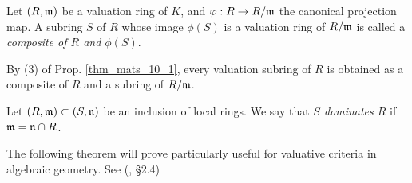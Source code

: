 \begin{defn}
Let $(R, \mathfrak{m})$ be a valuation ring of $K$, and $\varphi: R \to 
R/\mathfrak{m}$ the canonical projection map. A subring $S$ of $R$ whose
image $\phi(S)$ is a valuation ring of $R/\mathfrak{m}$ is called a
\emph{composite of $R$ and $\phi(S)$}.
\end{defn}

\begin{rmk}
By (3) of Prop. \ref{thm_mats_10_1}, every valuation subring of
$R$ is obtained as a composite of $R$ and a subring of 
$R/\mathfrak{m}$. 
\end{rmk}

\begin{defn}\label{defn_dominates}
Let $(R, \mathfrak{m}) \subset (S, \mathfrak{n})$ be an inclusion of 
local rings. We say that \emph{$S$ dominates $R$} if $\mathfrak{m} = 
\mathfrak{n} \cap R$.
\end{defn}

The following theorem will prove particularly useful for valuative 
criteria in algebraic geometry. See (\cite{Hart}, \S 2.4)
